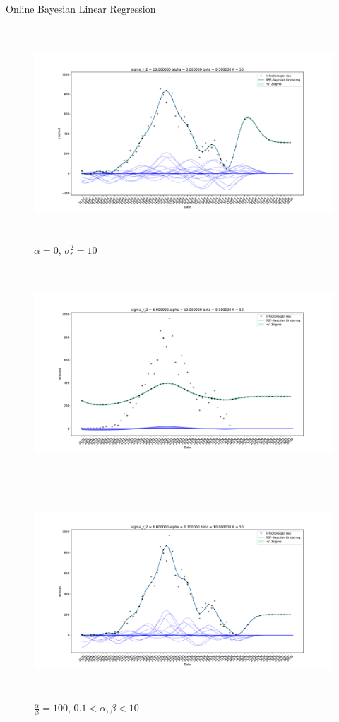 \documentclass[english]{exercisesheet}
\begin{document}
\begin{nexercise}{Online Bayesian Linear Regression}
\begin{solution}
\begin{figure}
        \caption{$\alpha = 0$, $\sigma_{r}^{2}=5$}
        \includegraphics[width=1\textwidth, height=8cm]{11.pdf}
        \caption{$\alpha = 0$, $\sigma_{r}^{2}=10$}
        \end{figure}
        \cleardoublepage
        \begin{figure}
        \includegraphics[width=1\textwidth, height=8cm]{12.pdf}
        \caption{$\frac{\alpha}{\beta}=100$, $0.1 <\alpha, \beta < 10$ }
        \includegraphics[width=1\textwidth, height=8cm]{13.pdf}

\end{figure}
\end{solution}
\end{nexercise}
\end{document}
